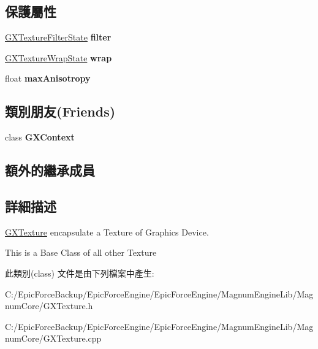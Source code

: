 \subsection*{保護屬性}
\begin{DoxyCompactItemize}
\item 
\hyperlink{class_magnum_1_1_g_x_texture_filter_state}{G\+X\+Texture\+Filter\+State} {\bfseries filter}\hypertarget{class_magnum_1_1_g_x_texture_a41ed1b3cce7c409c1d8a6c611df1815b}{}\label{class_magnum_1_1_g_x_texture_a41ed1b3cce7c409c1d8a6c611df1815b}

\item 
\hyperlink{class_magnum_1_1_g_x_texture_wrap_state}{G\+X\+Texture\+Wrap\+State} {\bfseries wrap}\hypertarget{class_magnum_1_1_g_x_texture_a3a12742913bd24948bbd14e25faec39e}{}\label{class_magnum_1_1_g_x_texture_a3a12742913bd24948bbd14e25faec39e}

\item 
float {\bfseries max\+Anisotropy}\hypertarget{class_magnum_1_1_g_x_texture_a4975ea45a187321dc7904f7d4b415ee3}{}\label{class_magnum_1_1_g_x_texture_a4975ea45a187321dc7904f7d4b415ee3}

\end{DoxyCompactItemize}
\subsection*{類別朋友(Friends)}
\begin{DoxyCompactItemize}
\item 
class {\bfseries G\+X\+Context}\hypertarget{class_magnum_1_1_g_x_texture_a2c36d7f8865080802bbad88cd73d871c}{}\label{class_magnum_1_1_g_x_texture_a2c36d7f8865080802bbad88cd73d871c}

\end{DoxyCompactItemize}
\subsection*{額外的繼承成員}


\subsection{詳細描述}
\hyperlink{class_magnum_1_1_g_x_texture}{G\+X\+Texture} encapsulate a Texture of Graphics Device. 

This is a Base Class of all other Texture 

此類別(class) 文件是由下列檔案中產生\+:\begin{DoxyCompactItemize}
\item 
C\+:/\+Epic\+Force\+Backup/\+Epic\+Force\+Engine/\+Epic\+Force\+Engine/\+Magnum\+Engine\+Lib/\+Magnum\+Core/G\+X\+Texture.\+h\item 
C\+:/\+Epic\+Force\+Backup/\+Epic\+Force\+Engine/\+Epic\+Force\+Engine/\+Magnum\+Engine\+Lib/\+Magnum\+Core/G\+X\+Texture.\+cpp\end{DoxyCompactItemize}
